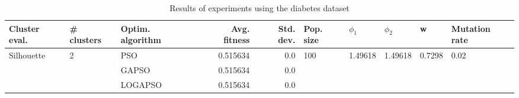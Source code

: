 \begin{table}
\centering
\caption{Results of experiments using the diabetes dataset}
\begin{tabular}{lllrrlllll}
\toprule
              Cluster eval. &        \# clusters & Optim. algorithm &  Avg. fitness &  Std. dev. &            Pop. size &               $\phi_{1}$ &               $\phi_{2}$ &                       w &         Mutation rate \\
\midrule
\multirow{3}{*}{Silhouette} & \multirow{3}{*}{2} &              PSO &      0.515634 &        0.0 & \multirow{3}{*}{100} & \multirow{3}{*}{1.49618} & \multirow{3}{*}{1.49618} & \multirow{3}{*}{0.7298} & \multirow{3}{*}{0.02} \\
                            &                    &            GAPSO &      0.515634 &        0.0 &                      &                          &                          &                         &                       \\
                            &                    &          LOGAPSO &      0.515634 &        0.0 &                      &                          &                          &                         &                       \\
\bottomrule
\end{tabular}
\end{table}
